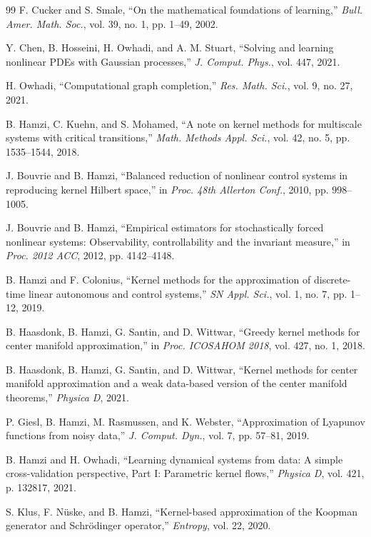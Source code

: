 \documentclass[11pt,a4paper]{article}
\begin{document}
\begin{thebibliography}{99}
F. Cucker and S. Smale, ``On the mathematical foundations of learning,'' \textit{Bull. Amer. Math. Soc.}, vol. 39, no. 1, pp. 1--49, 2002.

Y. Chen, B. Hosseini, H. Owhadi, and A. M. Stuart, ``Solving and learning nonlinear PDEs with Gaussian processes,'' \textit{J. Comput. Phys.}, vol. 447, 2021.

H. Owhadi, ``Computational graph completion,'' \textit{Res. Math. Sci.}, vol. 9, no. 27, 2021.

B. Hamzi, C. Kuehn, and S. Mohamed, ``A note on kernel methods for multiscale systems with critical transitions,'' \textit{Math. Methods Appl. Sci.}, vol. 42, no. 5, pp. 1535--1544, 2018.

J. Bouvrie and B. Hamzi, ``Balanced reduction of nonlinear control systems in reproducing kernel Hilbert space,'' in \textit{Proc. 48th Allerton Conf.}, 2010, pp. 998--1005.

J. Bouvrie and B. Hamzi, ``Empirical estimators for stochastically forced nonlinear systems: Observability, controllability and the invariant measure,'' in \textit{Proc. 2012 ACC}, 2012, pp. 4142--4148.

B. Hamzi and F. Colonius, ``Kernel methods for the approximation of discrete-time linear autonomous and control systems,'' \textit{SN Appl. Sci.}, vol. 1, no. 7, pp. 1--12, 2019.

B. Haasdonk, B. Hamzi, G. Santin, and D. Wittwar, ``Greedy kernel methods for center manifold approximation,'' in \textit{Proc. ICOSAHOM 2018}, vol. 427, no. 1, 2018.

B. Haasdonk, B. Hamzi, G. Santin, and D. Wittwar, ``Kernel methods for center manifold approximation and a weak data-based version of the center manifold theorems,'' \textit{Physica D}, 2021.

P. Giesl, B. Hamzi, M. Rasmussen, and K. Webster, ``Approximation of Lyapunov functions from noisy data,'' \textit{J. Comput. Dyn.}, vol. 7, pp. 57--81, 2019.

B. Hamzi and H. Owhadi, ``Learning dynamical systems from data: A simple cross-validation perspective, Part I: Parametric kernel flows,'' \textit{Physica D}, vol. 421, p. 132817, 2021.

S. Klus, F. N\"{u}ske, and B. Hamzi, ``Kernel-based approximation of the Koopman generator and Schr\"{o}dinger operator,'' \textit{Entropy}, vol. 22, 2020.


\end{thebibliography}
\end{document}
